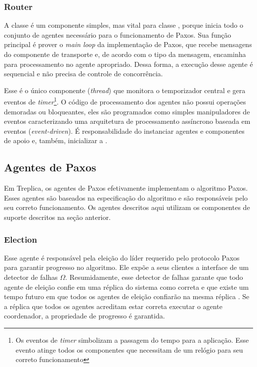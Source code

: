 \subsubsection{Router}

A classe  é um componente simples, mas vital para classe
, porque inicia todo o conjunto de agentes necessário para
o funcionamento de Paxos. Sua função principal é prover o \emph{main loop} da
implementação de Paxos, que recebe mensagens do componente de transporte e, de acordo com
o tipo da mensagem, encaminha para processamento no agente apropriado. Dessa forma, a
execução desse agente é sequencial e não precisa de controle de concorrência.

Esse é o único componente (\emph{thread}) que monitora o temporizador central e gera
eventos de \emph{timer}\footnote{Os eventos de \emph{timer} simbolizam a passagem do
tempo para a aplicação. Esse evento atinge todos os componentes que necessitam de um
relógio para seu correto funcionamento}. O código de processamento dos agentes não possui
operações demoradas ou bloqueantes, eles são programados como simples manipuladores de
eventos caracterizando uma arquitetura de processamento assíncrono baseada em eventos
(\emph{event-driven}). É responsabilidade do  instanciar agentes e
componentes de apoio e, também, inicializar a .

\subsection{Agentes de Paxos}\label{subsec:agentes_paxos}

Em Treplica, os agentes de Paxos efetivamente implementam o algoritmo Paxos.
Esses agentes são baseados na especificação do algoritmo e são responsáveis pelo seu
correto funcionamento. Os agentes descritos aqui utilizam os componentes de suporte
descritos na seção anterior.

\subsubsection{Election}

Esse agente é responsável pela eleição do líder requerido pelo protocolo Paxos para
garantir progresso no algoritmo. Ele expõe a seus clientes a interface de um detector de
falhas $\Omega$. Resumidamente, esse detector de falhas garante que todo agente de eleição
confie em uma réplica do sistema como correta e que existe um tempo futuro em que todos os
agentes de eleição confiarão na mesma réplica \cite{chandra96}. Se a réplica que todos os
agentes acreditam estar correta executar o agente coordenador, a propriedade de progresso
é garantida.

